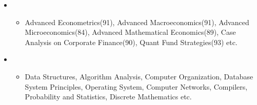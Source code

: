   \begin{itemize}[leftmargin=*]
    \item
      {\small
      \begin{itemize}
        \item{Advanced Econometrics(91), Advanced Macroeconomics(91), Advanced Microeconomics(84), Advanced Mathematical Economics(89), Case Analysis on Corporate Finance(90), Quant Fund Strategies(93) etc.}
      \end{itemize}
      }
    \item
      {\small
      \begin{itemize}
        \item{Data Structures, Algorithm Analysis, Computer Organization, Database System Principles, Operating System, Computer Networks, Compilers, Probability and Statistics, Discrete Mathematics etc.}
      \end{itemize}
      }
  \end{itemize}